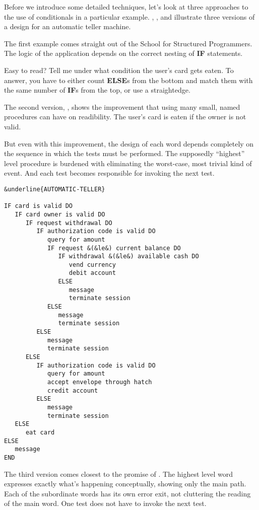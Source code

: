Before we introduce some detailed techniques, let's look at three approaches
to the use of conditionals in a particular example. ,
, and  illustrate three versions of a design for an
automatic teller machine.

The first example comes straight out of the School for Structured
Programmers. The logic of the application depends on the correct nesting
of \textbf{IF} statements.

Easy to read? Tell me under what condition the user's card gets
eaten. To answer, you have to either count \textbf{ELSE}s from the bottom and
match them with the same number of \textbf{IF}s from the top, or use a
straightedge.

The second version, , shows the improvement that using
many small, named procedures can have on readibility. The user's card is
eaten if the owner is not valid.

But even with this improvement, the design of each word depends
completely on the sequence in which the tests must be performed. The
supposedly ``highest'' level procedure is burdened with eliminating the
worst-case, most trivial kind of event. And each test becomes responsible
for invoking the next test.

\begin{figure*}[tp]
\begin{center}
\small\begin{BVerbatim}[commandchars=\&\{\},baselinestretch=0.85]
&underline{AUTOMATIC-TELLER}

IF card is valid DO
   IF card owner is valid DO
      IF request withdrawal DO
         IF authorization code is valid DO
            query for amount
            IF request &(&le&) current balance DO
               IF withdrawal &(&le&) available cash DO
                  vend currency
                  debit account
               ELSE
                  message
                  terminate session
            ELSE
               message
               terminate session
         ELSE
            message
            terminate session
      ELSE
         IF authorization code is valid DO
            query for amount
            accept envelope through hatch
            credit account
         ELSE
            message
            terminate session
   ELSE
      eat card
ELSE
   message
END
\end{BVerbatim}
\end{center}
\end{figure*}
The third version comes closest to the promise of \Forth{}. The
highest level word expresses exactly what's happening conceptually,
showing only the main path. Each of the subordinate words has its own
error exit, not cluttering the reading of the main word. One test does not
have to invoke the next test.

